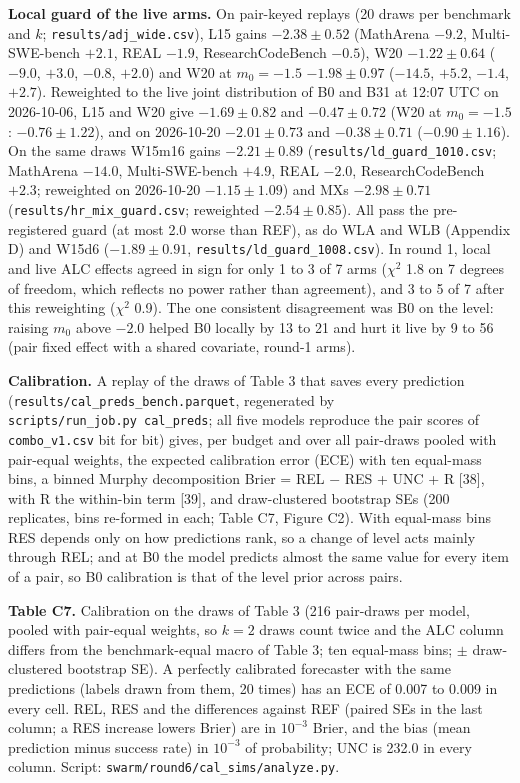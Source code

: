 \documentclass[
]{article}
\begin{document}
\textbf{Local guard of the live arms.} On pair-keyed replays (20 draws
per benchmark and \(k\); \texttt{results/adj\_wide.csv}), L15 gains
\(-2.38 \pm 0.52\) (MathArena \(-9.2\), Multi-SWE-bench \(+2.1\), REAL
\(-1.9\), ResearchCodeBench \(-0.5\)), W20 \(-1.22 \pm
0.64\) (\(-9.0\), \(+3.0\), \(-0.8\), \(+2.0\)) and W20 at
\(m_0 = -1.5\) \(-1.98 \pm 0.97\) (\(-14.5\), \(+5.2\), \(-1.4\),
\(+2.7\)). Reweighted to the live joint distribution of B0 and B31 at
12:07 UTC on 2026-10-06, L15 and W20 give \(-1.69 \pm 0.82\) and
\(-0.47 \pm 0.72\) (W20 at \(m_0 = -1.5\): \(-0.76 \pm 1.22\)), and on
2026-10-20 \(-2.01 \pm 0.73\) and \(-0.38 \pm 0.71\)
(\(-0.90 \pm 1.16\)). On the same draws W15m16 gains \(-2.21 \pm 0.89\)
(\texttt{results/ld\_guard\_1010.csv}; MathArena \(-14.0\),
Multi-SWE-bench \(+4.9\), REAL \(-2.0\), ResearchCodeBench \(+2.3\);
reweighted on 2026-10-20 \(-1.15 \pm 1.09\)) and MXs \(-2.98 \pm 0.71\)
(\texttt{results/hr\_mix\_guard.csv}; reweighted \(-2.54 \pm 0.85\)).
All pass the pre-registered guard (at most 2.0 worse than REF), as do
WLA and WLB (Appendix D) and W15d6 (\(-1.89 \pm 0.91\),
\texttt{results/ld\_guard\_1008.csv}). In round 1, local and live ALC
effects agreed in sign for only 1 to 3 of 7 arms (\(\chi^2\) 1.8 on 7
degrees of freedom, which reflects no power rather than agreement), and
3 to 5 of 7 after this reweighting (\(\chi^2\) 0.9). The one consistent
disagreement was B0 on the level: raising \(m_0\) above \(-2.0\) helped
B0 locally by 13 to 21 and hurt it live by 9 to 56 (pair fixed effect
with a shared covariate, round-1 arms).

\textbf{Calibration.} A replay of the draws of Table 3 that saves every
prediction (\texttt{results/cal\_preds\_bench.parquet}, regenerated by
\texttt{scripts/run\_job.py\ cal\_preds}; all five models reproduce the
pair scores of \texttt{combo\_v1.csv} bit for bit) gives, per budget and
over all pair-draws pooled with pair-equal weights, the expected
calibration error (ECE) with ten equal-mass bins, a binned Murphy
decomposition Brier = REL \(-\) RES + UNC + R {[}38{]}, with R the
within-bin term {[}39{]}, and draw-clustered bootstrap SEs (200
replicates, bins re-formed in each; Table C7, Figure C2). With
equal-mass bins RES depends only on how predictions rank, so a change of
level acts mainly through REL; and at B0 the model predicts almost the
same value for every item of a pair, so B0 calibration is that of the
level prior across pairs.

\textbf{Table C7.} Calibration on the draws of Table 3 (216 pair-draws
per model, pooled with pair-equal weights, so \(k = 2\) draws count
twice and the ALC column differs from the benchmark-equal macro of Table
3; ten equal-mass bins; \(\pm\) draw-clustered bootstrap SE). A
perfectly calibrated forecaster with the same predictions (labels drawn
from them, 20 times) has an ECE of 0.007 to 0.009 in every cell. REL,
RES and the differences against REF (paired SEs in the last column; a
RES increase lowers Brier) are in \(10^{-3}\) Brier, and the bias (mean
prediction minus success rate) in \(10^{-3}\) of probability; UNC is
232.0 in every column. Script:
\texttt{swarm/round6/cal\_sims/analyze.py}.
\end{document}
